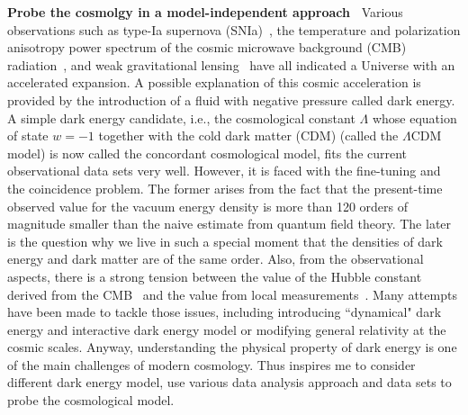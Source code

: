 \documentclass[11pt,letterpaper,sans]{moderncv}   %
\begin{document}
\vspace{2mm}
\textcolor{color1}{\textbf{Probe the cosmolgy in a model-independent approach~\cite{Cai:2015zoa,Cai:2015pia,Cai:2016vmn}}}
Various observations such as type-Ia supernova (SNIa)~\cite{Riess:1998cb,Perlmutter:1998np,Suzuki:2011hu,Betoule:2014frx}, the temperature and polarization anisotropy power spectrum of the cosmic microwave background (CMB) radiation~\cite{Hinshaw:2012aka,Ade:2015xua}, and weak gravitational lensing~\cite{Kilbinger:2008gk} have all indicated a Universe with an accelerated expansion. A possible explanation of this cosmic acceleration is provided by the introduction of a fluid with negative pressure called dark energy. A simple dark energy candidate, i.e., the cosmological constant $\Lambda$ whose equation of state $w =-1$ together with the cold dark matter (CDM) (called the $\Lambda$CDM model) is now called the  concordant cosmological model, fits the current observational data sets very well. However, it is faced with the fine-tuning and the coincidence problem. The former arises from the fact that the present-time observed value for the vacuum energy density is more than 120 orders of magnitude smaller than the naive estimate from quantum field theory. The later is the question why we live in such a special moment that the densities of dark energy and dark matter are of the same order.
Also, from the observational aspects, there is a strong tension between the value of the Hubble constant derived from the CMB~\cite{Ade:2015xua} and the value from local measurements~\cite{Riess:2011yx}. Many attempts have been made to tackle those issues, including introducing ``dynamical" dark energy and interactive dark energy model or modifying general relativity at the cosmic scales. Anyway, understanding the physical property of dark energy is one of the main challenges of modern cosmology. Thus inspires me to consider different dark energy model, use various data analysis approach and data sets to probe the cosmological model.
\end{document}
